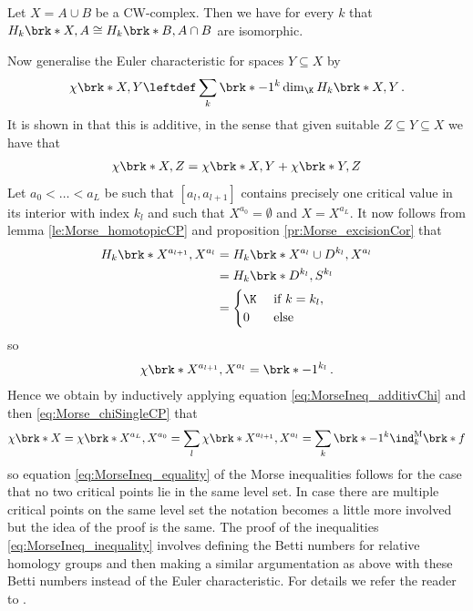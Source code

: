 \begin{proposition}
  \label{pr:Morse_excisionCor}
  Let $X=A\cup B$ be a CW-complex. Then we have for every $k$ that $H_k\brk*{X,A}\cong H_k\brk*{B,A\cap B}$
  are isomorphic.
\end{proposition}
Now generalise the Euler characteristic for spaces $Y\subseteq X$ by
\begin{align}
  \chi\brk*{X,Y}\leftdef \sum_k\brk*{-1}^k\dim_\K H_k\brk*{X,Y}\,.
  \label{eq:Morse_relativeEuler}
\end{align}
It is shown in \cite[§5]{Milnor1963} that this is additive, in the sense that given suitable $Z\subseteq Y\subseteq X$
we have that
\begin{align}
  \chi\brk*{X,Z}=\chi\brk*{X,Y}+\chi\brk*{Y,Z}\label{eq:MorseIneq_additivChi}
\end{align}
Let $a_0<\dots<a_L$ be such that $[a_l,a_{l+1}]$ contains precisely one critical value in its interior with
index $k_l$ and such that $X^{a_0}=\emptyset$ and  $X=X^{a_L}$.
It now follows from lemma \ref{le:Morse_homotopicCP} and proposition \ref{pr:Morse_excisionCor} that
\begin{align*}
  H_k\brk*{X^{a_{l+1}},X^{a_{l}}}
  &=H_k\brk*{X^{a_{l}}\cup D^{k_l},X^{a_{l}}} \\
  &= H_k\brk*{D^{k_l},S^{k_l}} \\
  &=\begin{cases}
    \K &\text{ if }k=k_l,\\
    0 &\text{ else}
  \end{cases}
\end{align*}
so
\begin{align}
  \chi\brk*{X^{a_{l+1}},X^{a_l}}=\brk*{-1}^{k_l}\,.\label{eq:Morse_chiSingleCP}
\end{align}
Hence we obtain by inductively applying equation \eqref{eq:MorseIneq_additivChi}
and then \eqref{eq:Morse_chiSingleCP} that
\begin{align*}
  \chi\brk*{X}=\chi\brk*{X^{a_L},X^{a_0}}=\sum_l \chi\brk*{X^{a_{l+1}},X^{a_l}}
  =\sum_k\brk*{-1}^k\ind^\text{M}_k\brk*{f}
\end{align*}
so equation \eqref{eq:MorseIneq_equality} of the Morse inequalities follows
for the case that no two critical points lie in the same level set.
In case there are multiple critical points on the same level set the notation
becomes a little more involved but the idea of the proof is the same.
The proof of the inequalities \eqref{eq:MorseIneq_inequality} involves defining the
Betti numbers for relative homology groups and then making a similar argumentation
as above with these Betti numbers instead of the Euler characteristic. For details we refer the reader to \cite[§5]{Milnor1963}.


